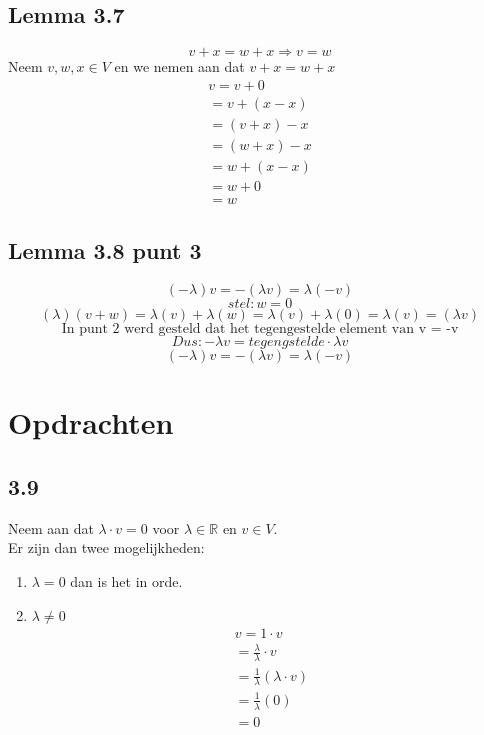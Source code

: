 \documentclass[lineaire_algebra_oplossingen.tex]{subfiles}
\begin{document}
\subsection*{Lemma 3.7}

$$v+x = w + x \Rightarrow v=w$$
Neem $v,w,x \in V$ en we nemen aan dat $v+x = w+x$\\
\begin{align*}
v = v + 0 \tag{neutraal element}\\
= v + (x - x) \tag{invers element}\\
=(v+x) -x \tag{communativiteit}\\
=(w+x) -x \tag{dit hebben we aangenomen}\\
= w +(x-x) \tag{communitativiteit}\\
= w+0 \tag{invers element}\\
=w \tag{neutraal element}
\end{align*}

\subsection*{Lemma 3.8 punt 3}
\[(-\lambda)v = -(\lambda v) = \lambda(-v)\]
\[stel:w=0\]
\[(\lambda)(v+w) = \lambda(v) + \lambda(w) = \lambda(v) + \lambda(0) = \lambda(v) = (\lambda v) \]
\[\text{In punt 2 werd gesteld dat het tegengestelde element van v = -v}\]
\[Dus: -\lambda v = tegengstelde \cdot \lambda v\]
\[(-\lambda)v = -(\lambda v) = \lambda(-v) \]

\section{Opdrachten}
\subsection*{3.9}
Neem aan dat $\lambda \cdot v = 0$ voor $\lambda \in \mathbb{R}$ en $v \in V$.\\
Er zijn dan twee mogelijkheden:\\
\begin{enumerate}
\item $\lambda = 0$ dan is het in orde.
\item $\lambda \neq 0$
\begin{align*}
v = 1\cdot v \tag{co\"efficient}
\\
= \frac{\lambda}{\lambda}\cdot v
\\
= \frac{1}{\lambda}(\lambda \cdot v) \tag{gemegde associativiteit}
\\
= \frac{1}{\lambda}(0) \tag{lemma 3.8.1}
\\
= 0
\end{align*}

\end{enumerate}
\end{document}
